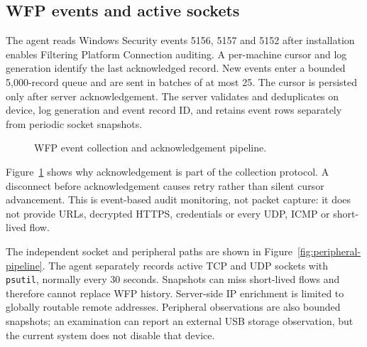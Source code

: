 \documentclass[12pt,a4paper]{report}
\begin{document}
\subsection{WFP events and active sockets}
The agent reads Windows Security events 5156, 5157 and 5152 after installation
enables Filtering Platform Connection auditing. A per-machine cursor and log
generation identify the last acknowledged record. New events enter a bounded
5,000-record queue and are sent in batches of at most 25. The cursor is
persisted only after server acknowledgement. The server validates and
deduplicates on device, log generation and event record ID, and retains event
rows separately from periodic socket snapshots.

\begin{figure}[H]
\centering
{}
\caption{WFP event collection and acknowledgement pipeline.}
\label{fig:wfp-pipeline}
\end{figure}

Figure~\ref{fig:wfp-pipeline} shows why acknowledgement is part of the
collection protocol. A disconnect before acknowledgement causes retry rather
than silent cursor advancement. This is event-based audit monitoring, not
packet capture: it does not provide URLs, decrypted HTTPS, credentials or
every UDP, ICMP or short-lived flow.

The independent socket and peripheral paths are shown in
Figure~\ref{fig:peripheral-pipeline}. The agent separately records active TCP
and UDP sockets with \texttt{psutil},
normally every 30 seconds. Snapshots can miss short-lived flows and therefore
cannot replace WFP history. Server-side IP enrichment is limited to globally
routable remote addresses. Peripheral observations are also bounded snapshots;
an examination can report an external USB storage observation, but the current
system does not disable that device.
\end{document}
